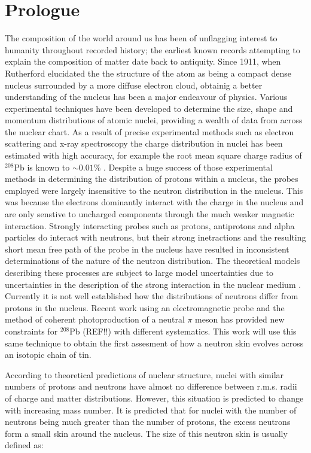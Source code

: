 \chapter{Prologue}

\indent The composition of the world around us has been of unflagging interest to humanity throughout recorded history; the earliest known records attempting to explain the composition of matter date back to antiquity. Since 1911, when Rutherford elucidated the the structure of the atom as being  a compact dense nucleus surrounded by a more diffuse electron cloud, obtainig a better understanding of the nucleus has been a major endeavour of physics. Various experimental techniques have been developed to determine the size, shape and momentum distributions of atomic nuclei, providing a wealth of data from across the nuclear chart. As a result of precise experimental methods such as electron scattering and x-ray spectroscopy the charge distribution in nuclei has been estimated with high accuracy, for example the root mean square charge radius of $^{208}$Pb is known to $\sim0.01\%$ \cite{devires}. Despite a huge success of those experimental methods in determining the distribution of protons within a nucleus, the probes employed were largely insensitive to the neutron distribution in the nucleus. This was because the electrons dominantly interact with the charge in the nucleus and are only senstive to uncharged components through the much weaker magnetic interaction. Strongly interacting probes such as protons, antiprotons and alpha particles do interact with neutrons, but their strong inetractions and the resulting short mean free path of the probe in the nucleus have resulted in inconsistent determinations of the nature of the neutron distribution. The theoretical models describing these processes are subject to large model uncertainties due to uncertainties in the description of the strong interaction in the nuclear medium \cite{claire}. Currently it is not well established how the distributions of neutrons differ from protons in the nucleus. Recent work using an electromagnetic probe and the method of coherent photoproduction of a neutral $\pi$ meson has provided new constraints for $^{208}$Pb (REF!!) with different systematics. This work will use this same technique to obtain the first assesment of how a neutron skin evolves across an isotopic chain of tin.

\indent According to theoretical predictions of nuclear structure, nuclei with similar numbers of protons and neutrons have almost no difference between r.m.s. radii of charge and matter distributions. However, this situation is predicted to change with increasing mass number. It is predicted that for nuclei with the number of neutrons being much greater than the number of protons, the excess neutrons form a small skin around the nucleus. The size of this neutron skin is usually defined as:

